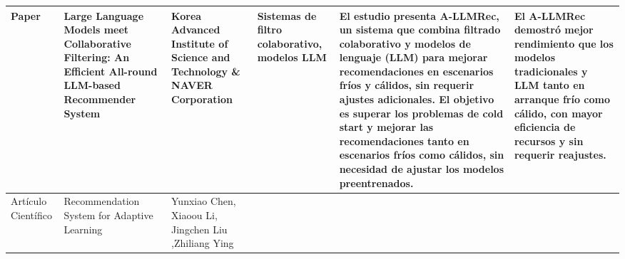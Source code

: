 \documentclass{scrartcl}
\begin{document}
\begin{landscape}
\begin{longtable}{|C{0.1\textwidth}|C{0.15\textwidth}|C{0.15\textwidth}|C{0.1\textwidth}|C{0.4\textwidth}|C{0.25\textwidth}|}
   Paper & Large Language Models meet Collaborative Filtering: An Efficient All-round LLM-based Recommender System & Korea Advanced Institute of Science and Technology \& NAVER Corporation & Sistemas de filtro colaborativo, modelos LLM & El estudio presenta A-LLMRec, un sistema que combina filtrado colaborativo y modelos de lenguaje (LLM) para mejorar recomendaciones en escenarios fríos y cálidos, sin requerir ajustes adicionales. El objetivo es superar los problemas de cold start y mejorar las recomendaciones tanto en escenarios fríos como cálidos, sin necesidad de ajustar los modelos preentrenados. & El A-LLMRec demostró mejor rendimiento que los modelos tradicionales y LLM tanto en arranque frío como cálido, con mayor eficiencia de recursos y sin requerir reajustes. \\ \hline
   Artículo Científico & Recommendation System for Adaptive Learning & Yunxiao Chen, Xiaoou Li, Jingchen Liu ,Zhiliang Ying & & &
  \end{longtable}


\end{landscape}
\end{document}
